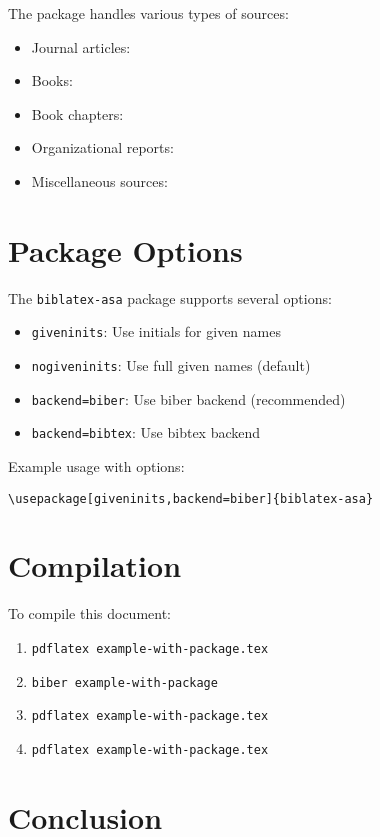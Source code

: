\documentclass{article}
\begin{document}
The package handles various types of sources:
\begin{itemize}
    \item Journal articles: \parencite{brown2022}
    \item Books: \parencite{johnson2019}
    \item Book chapters: \parencite{wilson2021}
    \item Organizational reports: \parencite{WHO2022}
    \item Miscellaneous sources: \parencite{ASA1997}
\end{itemize}

\section{Package Options}

The \texttt{biblatex-asa} package supports several options:

\begin{itemize}
    \item \texttt{giveninits}: Use initials for given names
    \item \texttt{nogiveninits}: Use full given names (default)
    \item \texttt{backend=biber}: Use biber backend (recommended)
    \item \texttt{backend=bibtex}: Use bibtex backend
\end{itemize}

Example usage with options:
\begin{verbatim}
\usepackage[giveninits,backend=biber]{biblatex-asa}
\end{verbatim}

\section{Compilation}

To compile this document:
\begin{enumerate}
    \item \texttt{pdflatex example-with-package.tex}
    \item \texttt{biber example-with-package}
    \item \texttt{pdflatex example-with-package.tex}
    \item \texttt{pdflatex example-with-package.tex}
\end{enumerate}

\section{Conclusion}
\end{document}
